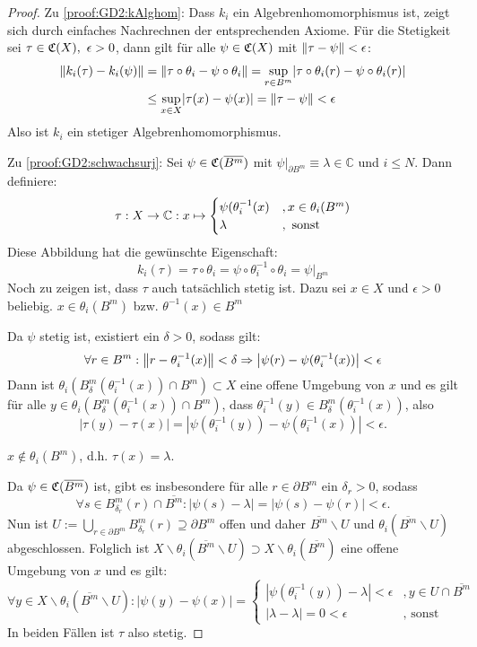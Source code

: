 \begin{proof}
Zu \ref{proof:GD2:kAlghom}: Dass $k_i$ ein Algebrenhomomorphismus ist, zeigt sich durch einfaches Nachrechnen der entsprechenden Axiome. Für die Stetigkeit sei $\tau \in \mathfrak{C}(X), ~\epsilon > 0$, dann gilt für alle $\psi \in \mathfrak{C}(X)$ mit $\left\lVert\tau - \psi\right\rVert < \epsilon $:
\begin{align*}
\left\lVert k_i(\tau)-k_i(\psi)\right\rVert &= \left\lVert\tau \circ \theta_i - \psi \circ \theta_i\right\rVert = \underset{r \in B^m}{\sup} |\tau \circ \theta_i(r) - \psi \circ \theta_i(r)| \\
 &\leq \underset{x \in X}{\sup} |\tau (x) - \psi (x)| = \left\lVert\tau- \psi\right\rVert < \epsilon
\end{align*}
Also ist $k_i$ ein stetiger Algebrenhomomorphismus.

Zu \ref{proof:GD2:schwachsurj}: Sei $\psi \in \mathfrak{C}(\overline{B^m} )$ mit $\psi|_{\partial B^m} \equiv \lambda \in \mathbb{C}$ und $i \leq N$. Dann definiere:
\[\tau: X \to \mathbb{C}: x \mapsto \begin{cases} \psi(\theta_i^{-1}(x) &, x \in \theta_i(B^m) \\ \lambda &, \text{ sonst} \end{cases} \]
Diese Abbildung hat die gewünschte Eigenschaft:
\[k_i(\tau) = \tau \circ \theta_i = \psi \circ \theta_i^{-1} \circ \theta_i = \psi|_{B^m}\]
Noch zu zeigen ist, dass $\tau$ auch tatsächlich stetig ist. Dazu sei $x \in X$ und $\epsilon > 0$ beliebig.
 $x \in \theta_i(B^m)$ bzw. $\theta^{-1}(x) \in B^m$

Da $\psi$ stetig ist, existiert ein $\delta > 0$, sodass gilt: 
	\[\forall r \in B^m: \left\lVert r - \theta_i^{-1}(x)\right\rVert <\delta \Rightarrow \left|\psi(r) - \psi(\theta_i^{-1}(x))\right| < \epsilon \]
Dann ist $\theta_i\left(B_\delta^m(\theta_i^{-1}(x)) \cap B^m\right) \subset X$ eine offene Umgebung von $x$ und es gilt für alle $y \in \theta_i\left(B_\delta^m(\theta_i^{-1}(x)) \cap B^m\right)$, dass $\theta_i^{-1}(y) \in B_\delta^m(\theta_i^{-1}(x))$, also
	\[\left|\tau(y) - \tau(x)\right| = \left|\psi(\theta_i^{-1}(y)) - \psi(\theta_i^{-1}(x))\right| < \epsilon.\]

 $x \notin \theta_i(B^m)$, d.h. $\tau(x) = \lambda$.

Da $\psi \in \mathfrak{C}(\overline{B^m})$ ist, gibt es insbesondere für alle $r \in \partial B^m$ ein $\delta_r > 0 $, sodass
	\[\forall s \in B_{\delta_r}^m(r) \cap \overline{B^m}: |\psi(s) - \lambda| = |\psi(s) - \psi(r)| < \epsilon.\]
Nun ist $U := \bigcup_{r \in \partial B^m}B_{\delta_r}^m(r) \supseteq \partial B^m$ offen und daher $\overline{B^m} \backslash U$ und $\theta_i\left(\overline{B^m} \backslash U\right)$ abgeschlossen. Folglich ist $X \backslash \theta_i\left(\overline{B^m} \backslash U\right) \supset X \backslash \theta_i(\overline{B^m})$ eine offene Umgebung von $x$ und es gilt:
	\[\forall y \in X \backslash \theta_i\left(\overline{B^m} \backslash U\right): \left|\psi(y) - \psi(x)\right| = \begin{cases} |\psi(\theta_i^{-1}(y)) - \lambda| < \epsilon &, y \in U \cap \overline{B^m} \\ |\lambda - \lambda| = 0 < \epsilon &, \text{ sonst}\end{cases}\]
In beiden Fällen ist $\tau$ also stetig.


\end{proof}
